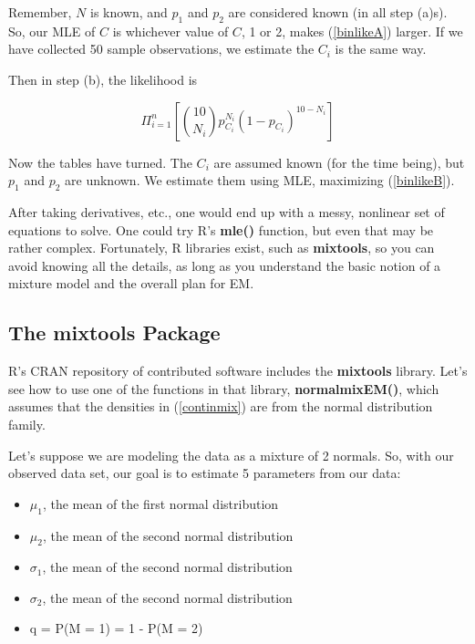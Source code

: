 Remember, $N$ is known, and $p_1$ and $p_2$ are considered known (in all
step (a)s).  So, our MLE of $C$ is whichever value of $C$, 1 or 2, makes
(\ref{binlikeA}) larger.  If we have collected 50 sample observations, we
estimate the $C_i$ is the same way.

Then in step (b), the likelihood is

\begin{equation}
\label{binlikeB}
\Pi_{i=1}^n
\left [ \binom{10}{N_i} p_{C_i}^{N_i} (1-p_{C_i})^{10-N_i} 
\right ]
\end{equation}

Now the tables have turned.  The $C_i$ are assumed known (for the time
being), but $p_1$ and $p_2$ are unknown.  We estimate them using MLE,
maximizing (\ref{binlikeB}).

After taking derivatives, etc., one would end up with a messy, nonlinear
set of equations to solve.  One could try R's {\bf mle()} function, but
even that may be rather complex.  Fortunately, R libraries exist, such
as {\bf mixtools}, so you can avoid knowing all the details, as long as
you understand the basic notion of a mixture model and the overall plan
for EM.  

\subsection{The mixtools Package}

R's CRAN repository of contributed software includes the {\bf mixtools}
library.  Let's see how to use one of the functions in that library,
{\bf normalmixEM()}, which assumes that the densities in
(\ref{continmix}) are from the normal distribution family.

Let's suppose we are modeling the data as a mixture of 2 normals.
So, with our observed data set, our goal is to estimate 5 parameters
from our data:  

\begin{itemize}

\item $\mu_1$, the mean of the first normal distribution 

\item $\mu_2$, the mean of the second normal distribution 

\item $\sigma_1$, the mean of the second normal distribution 

\item $\sigma_2$, the mean of the second normal distribution 

\item q = P(M = 1) = 1 - P(M = 2)

\end{itemize}

